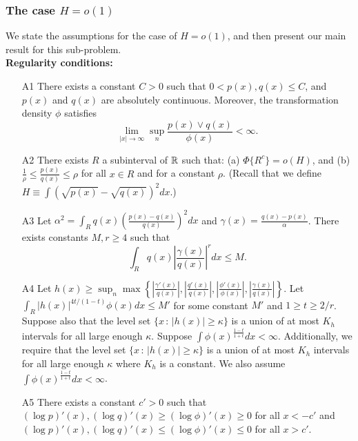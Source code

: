\documentclass{article}
\begin{document}
\subsubsection{The case $H = o(1)$}

We state the assumptions for the case of $H = o(1)$, and then present our main result for this sub-problem.\\

\noindent \textbf{Regularity conditions:} 
\begin{enumerate}
\item[A1] There exists a constant $C >0$ such that  $0 < p(x), q(x) \leq C$, and $p(x)$ and $q(x)$ are absolutely continuous.  Moreover, the transformation density $\phi$ satisfies 
$$\lim_{|x| \rightarrow \infty} \sup_n \frac{p(x) \vee q(x)}{\phi(x)} < \infty.$$

\item[A2] There exists $R$ a subinterval of ${\mathbb R}$ such that: (a) $\Phi\{R^c\} = o(H)$, and (b)  $\frac{1}{\rho} \leq \frac{p(x)}{q(x)} \leq \rho $  for all $x \in R$ and for a constant $\rho$. (Recall that we define $H \equiv \int (\sqrt{p(x)} - \sqrt{q(x)})^2 dx$.)

\item[A3] Let $\alpha^2 = \int_R q(x) \left( \frac{p(x) - q(x)}{q(x)} \right)^2 dx$ and $\gamma(x) = \frac{q(x) - p(x)}{\alpha}$. There exists constants $M, r \geq 4$ such that  
$$\int_R q(x) \left| \frac{\gamma(x)}{q(x)} \right|^r dx  \leq M.$$

\item[A4] Let $h(x) \geq \sup_n \max \left\{  \left|\frac{\gamma'(x)}{q(x)} \right|, 
 \left|\frac{q'(x)}{q(x)}\right|, \left| \frac{\phi'(x)}{\phi(x)}\right|, \left | \frac{\gamma(x)}{q(x)} \right|  \right\} $. Let $\int_R |h(x)|^{4t/(1-t)} \phi(x) dx \leq M'$ for some constant $M'$ and $1 \geq t \geq 2/r$. Suppose also that the level set $\{x \,:\, |h(x)| \geq \kappa\}$ is a union of at most $K_h$ intervals for all large enough $\kappa$. Suppose $\int \phi(x)^{\frac{1-t}{1+t}} dx < \infty$.
Additionally, we require that the level set $\{x \,:\, |h(x)| \geq \kappa\}$ is a union of at most $K_h$ intervals for all large enough $\kappa$ where $K_h$ is a constant. We also assume $\int \phi(x)^{\frac{1-t}{1+t}} dx < \infty$.

\item[A5]  There exists a constant $c' > 0$ such that $(\log p)'(x), (\log q)'(x) \geq (\log \phi)'(x) \geq 0$ for all $x < -c'$ and $ (\log p)'(x), (\log q)'(x) \leq (\log \phi)'(x) \leq 0$ for all $x > c'$.
\end{enumerate}
\end{document}
